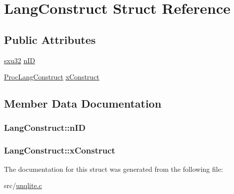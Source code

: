 \hypertarget{struct_lang_construct}{\section{Lang\-Construct Struct Reference}
\label{d8/d0f/struct_lang_construct}
}
\subsection*{Public Attributes}
\begin{DoxyCompactItemize}
\item 
\hyperlink{unqlite_8c_abc5a8a3f345c200c98c485551f49666e}{sxu32} \hyperlink{struct_lang_construct_a1d5cf2e989a33b961569f8866cf847f2}{n\-I\-D}
\item 
\hyperlink{unqlite_8c_a9f4117b078ce77de8c3f2a5435e316bc}{Proc\-Lang\-Construct} \hyperlink{struct_lang_construct_a40e5490904b10833d29a4ff7b866fdc7}{x\-Construct}
\end{DoxyCompactItemize}


\subsection{Member Data Documentation}
\hypertarget{struct_lang_construct_a1d5cf2e989a33b961569f8866cf847f2}{
\subsubsection[{n\-I\-D}]{ Lang\-Construct\-::n\-I\-D}}\label{d8/d0f/struct_lang_construct_a1d5cf2e989a33b961569f8866cf847f2}
\hypertarget{struct_lang_construct_a40e5490904b10833d29a4ff7b866fdc7}{
\subsubsection[{x\-Construct}]{ Lang\-Construct\-::x\-Construct}}\label{d8/d0f/struct_lang_construct_a40e5490904b10833d29a4ff7b866fdc7}


The documentation for this struct was generated from the following file\-:\begin{DoxyCompactItemize}
\item 
src/\hyperlink{unqlite_8c}{unqlite.\-c}\end{DoxyCompactItemize}
